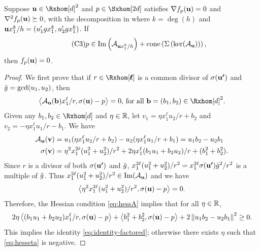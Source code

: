 \documentclass[final,onefignum,onetabnum]{siamart220329}
\begin{document}
\begin{proposition} \label{prop:second_order_property_factor} Suppose
  $\vecp{u} \in \Rxhom[d]^2$ and $p \in \Sxhom[2d]$ satisfies
  $\nabla f_p(\boldsymbol{\mathbf{u}}) = 0$ and $\nabla^2 f_p(\boldsymbol{\mathbf{u}}) \succeq 0$, with the
  decomposition in  where $k = \deg(h)$ and
  $\boldsymbol{\mathbf{u}}x_1^k/h = (u_1'g x_1^k, u_2'g x_1^k)$. If
  \begin{align} \tag{C3}\label{eq:prop_factored}
    p \in \operatorname{Im}\left( \mathcal{A}_{\boldsymbol{\mathbf{u}}x_1^k/h} \right)
    + \operatorname{cone}\left( \Sigma\left( \ker(\mathcal{A}_{\boldsymbol{\mathbf{u}}}) \right) \right),
  \end{align}
  then $f_p(\boldsymbol{\mathbf{u}}) = 0$.
  \begin{proof}
    We first prove that if $r \in \Rxhom[\pmb{\ell}]$ is a common divisor of
    $\sigma(\boldsymbol{\mathbf{u'}})$ and $\hat{g} = \gcd(u_1, u_2)$, then
    \begin{align} \label{eq:identity-factored}
      \dotp{\Aup(\vecp{b}) x_1^\ell/r, \sig(\vecp{u}) - p} = 0,\,
      \text{for all } \vecp{b} = (b_1, b_2) \in \Rxhom[d]^2.
    \end{align}
    Given any $b_1, b_2 \in \Rxhom[d]$ and $\eta \in \mathbb{R}$, let
    $v_1 = \eta x_1^\ell u_2/r + b_2$ and $v_2 = -\eta x_1^\ell u_1/r - b_1$. We have
    \begin{align}\label{eq:Au-identity-factored}
      \mathcal{A}_{\boldsymbol{\mathbf{u}}}(\boldsymbol{\mathbf{v}}) & = u_1 (\eta x_1^\ell u_2/r + b_2) - u_2 (\eta x_1^\ell u_1/r + b_1)
                       = u_1b_2 - u_2b_1\\
      \label{eq:sig-identity-factored}
      \sigma(\boldsymbol{\mathbf{v}}) & = \eta^2 x_1^{2\ell} (u_1^2 + u_2^2)/r^2
                       + 2\eta x_1^\ell (b_1 u_1 + b_2 u_2)/r
                       + (b_1^2 + b_2^2).
    \end{align}
    Since $r$ is a divisor of both $\sigma(\boldsymbol{\mathbf{u'}})$ and $\hat{g}$,
    $x_1^{2\ell} (u_1^2 + u_2^2)/r^2 = x_1^{2\ell} \sigma(\boldsymbol{\mathbf{u'}}) \hat{g}^2/r^2$ is
    a multiple of $\hat{g}$. Thus $x_1^{2\ell} (u_1^2 + u_2^2)/r^2 \in \operatorname{Im}(\mathcal{A}_{\boldsymbol{\mathbf{u}}})$
    and we have
    \begin{align*}
      \left\langle \eta^2 x_1^{2\ell} (u_1^2 + u_2^2)/r^2, \sigma(\boldsymbol{\mathbf{u}}) - p \right\rangle = 0.
    \end{align*}
    Therefore, the Hessian condition \eqref{eq:hessA} implies that for all
    $\eta \in \mathbb{R}$,
    \begin{equation}
      \label{eq:hesseta}
      2\eta \left\langle (b_1 u_1 + b_2 u_2)x_1^\ell/r, \sigma(\boldsymbol{\mathbf{u}}) - p \right\rangle
      + \left\langle b_1^2 + b_2^2, \sigma(\boldsymbol{\mathbf{u}}) - p \right\rangle
      + 2\left\lVert u_1b_2 - u_2b_1 \right\lVert^2 \ge 0.
    \end{equation}
    This implies the identity \eqref{eq:identity-factored}; otherwise there
    exists $\eta$ such that \eqref{eq:hesseta} is negative.


\end{proof}
\end{proposition}
\end{document}
